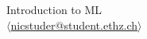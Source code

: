 \documentclass[a4paper, 11pt]{article}
\theoremstyle{compact_definition}
\begin{document}
\begin{center}
  \large Introduction to ML \\
  \small \(\langle\)\href{https://google.com}{nicstuder@student.ethz.ch}\(\rangle\)
\end{center}
\end{document}

